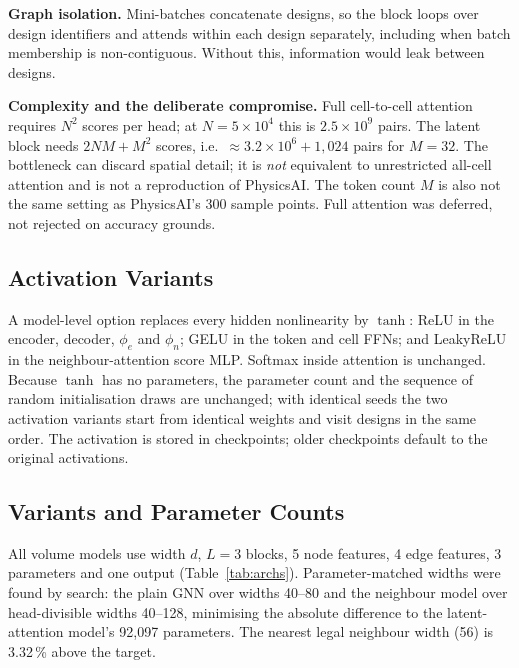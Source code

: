 \documentclass[journal]{IEEEtran}
\begin{document}
\textbf{Graph isolation.} Mini-batches concatenate designs, so the block loops
over design identifiers and attends within each design separately, including
when batch membership is non-contiguous. Without this, information would leak
between designs.

\textbf{Complexity and the deliberate compromise.} Full cell-to-cell attention
requires $N^2$ scores per head; at $N=5\times10^4$ this is $2.5\times10^9$
pairs. The latent block needs $2NM+M^2$ scores, i.e.\
$\approx3.2\times10^6+1{,}024$ pairs for $M=32$. The bottleneck can discard
spatial detail; it is \emph{not} equivalent to unrestricted all-cell attention
and is not a reproduction of PhysicsAI. The token count $M$ is also not the
same setting as PhysicsAI's 300 sample points.
Full attention was deferred, not rejected on accuracy grounds.

\subsection{Activation Variants}
A model-level option replaces every hidden nonlinearity by $\tanh$: ReLU in the
encoder, decoder, $\phi_e$ and $\phi_n$; GELU in the token and cell FFNs; and
LeakyReLU in the neighbour-attention score MLP. Softmax inside attention is
unchanged. Because $\tanh$ has no parameters, the parameter count and the
sequence of random initialisation draws are unchanged; with identical seeds the
two activation variants start from identical weights and visit designs in the
same order. The activation is stored in checkpoints; older checkpoints default
to the original activations.

\subsection{Variants and Parameter Counts}
All volume models use width $d$, $L=3$ blocks, 5 node features, 4 edge
features, 3 parameters and one output (Table~\ref{tab:archs}). Parameter-matched
widths were found by search: the plain GNN over widths 40--80 and the neighbour
model over head-divisible widths 40--128, minimising the absolute difference to
the latent-attention model's 92{,}097 parameters. The nearest legal neighbour
width (56) is 3.32\,\% above the target.
\end{document}
